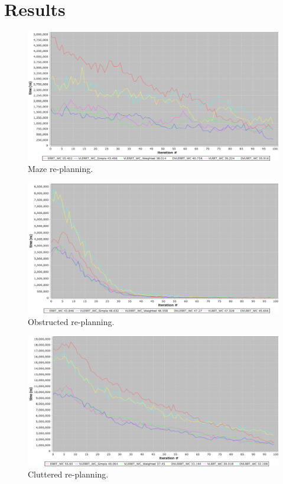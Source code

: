 \documentclass[10pt,twoside,twocolumn]{article}
\begin{document}
\section{Results}

\begin{figure}[h]
\begin{center}
\includegraphics[scale=0.2]{maze_wc.png}
\end{center}
\caption{Maze re-planning.}
\end{figure}


\begin{figure}[h]
\begin{center}
\includegraphics[scale=0.2]{obstructed_wc.png}
\end{center}
\caption{Obstructed re-planning.}
\end{figure}


\begin{figure}[h]
\begin{center}
\includegraphics[scale=0.2]{cluttered_wc.png}
\end{center}
\caption{Cluttered re-planning.}
\end{figure}
\end{document}
